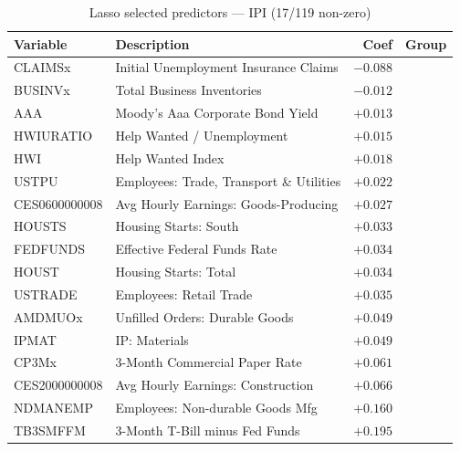 \documentclass[12pt, a4paper]{article}
\begin{document}
{%
\setlength{\floatsep}{6pt plus 1pt minus 1pt}
\setlength{\textfloatsep}{6pt plus 1pt minus 1pt}
\begin{table}[H]
\centering
\caption{Lasso selected predictors — IPI (17/119 non-zero)}
\begin{tabular}{llrl}
\toprule
Variable & Description & Coef & Group \\
\midrule
CLAIMSx        & Initial Unemployment Insurance Claims      & $-0.088$ \\
BUSINVx        & Total Business Inventories                 & $-0.012$ \\
AAA            & Moody's Aaa Corporate Bond Yield           & $+0.013$ \\
HWIURATIO      & Help Wanted / Unemployment                 & $+0.015$ \\
HWI            & Help Wanted Index                          & $+0.018$ \\
USTPU          & Employees: Trade, Transport \& Utilities   & $+0.022$ \\
CES0600000008  & Avg Hourly Earnings: Goods-Producing       & $+0.027$ \\
HOUSTS         & Housing Starts: South                      & $+0.033$ \\
FEDFUNDS       & Effective Federal Funds Rate               & $+0.034$ \\
HOUST          & Housing Starts: Total                      & $+0.034$ \\
USTRADE        & Employees: Retail Trade                    & $+0.035$ \\
AMDMUOx        & Unfilled Orders: Durable Goods             & $+0.049$ \\
IPMAT          & IP: Materials                              & $+0.049$ \\
CP3Mx          & 3-Month Commercial Paper Rate              & $+0.061$ \\
CES2000000008  & Avg Hourly Earnings: Construction          & $+0.066$ \\
NDMANEMP       & Employees: Non-durable Goods Mfg           & $+0.160$ \\
TB3SMFFM       & 3-Month T-Bill minus Fed Funds             & $+0.195$ \\
\bottomrule
\end{tabular}
\end{table}

}
\end{document}
